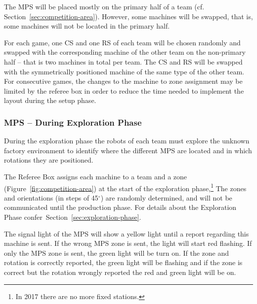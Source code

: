 \documentclass[12pt,twoside]{article}
\newcommand{\refsec}[1]{Section~\ref{#1}}
\newcommand{\reffig}[1]{Figure~\ref{#1}}
\begin{document}
The MPS will be placed mostly on the primary half of a team
(cf. \refsec{sec:competition-area}). However, some machines will be
swapped, that is, some machines will not be located in the primary
half.

For each game, one CS and one RS of each team will be chosen randomly
and swapped with the corresponding machine of the other team on the
non-primary half -- that is two machines in total per team. The CS and
RS will be swapped with the symmetrically positioned machine of the
same type of the other team. For consecutive games, the changes to the
machine to zone assignment may be limited by the referee box in order
to reduce the time needed to implement the layout during the setup
phase.

\subsubsection{MPS -- During Exploration Phase}
\label{sec:production-machines-exp}
During the exploration phase the robots of each team must explore the
unknown factory environment to identify where the different MPS are
located and in which rotations they are positioned.

The Referee Box assigns each machine to a team and a zone
(\reffig{fig:competition-area}) at the start of the exploration
phase,\footnote{In 2017 there are no more fixed stations.}
The zones and orientations (in steps of 45$^\circ$) are randomly determined,  and will not be
communicated until the production phase. For details about the
Exploration Phase confer~\refsec{sec:exploration-phase}.

The signal light of the MPS will show a yellow light until a report regarding this machine is sent.
If the wrong MPS zone is sent, the light will start red flashing.
If only the MPS zone is sent, the green light will be turn on.
If the zone and rotation is correctly reported, the green light will be flashing and if the zone is correct but the rotation wrongly reported the red and green light will be on.
\end{document}
